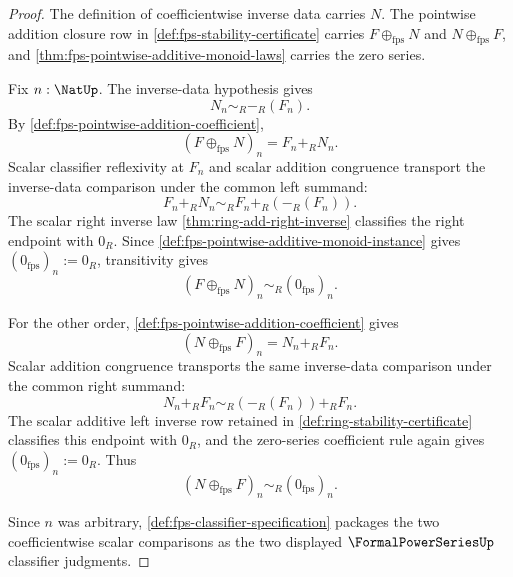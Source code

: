 \begin{proof}
The definition of coefficientwise inverse data carries $N$. The pointwise addition closure row in \autoref{def:fps-stability-certificate} carries $F\oplus_{\mathrm{fps}}N$ and $N\oplus_{\mathrm{fps}}F$, and \autoref{thm:fps-pointwise-additive-monoid-laws} carries the zero series.

Fix $n:\NatUp$. The inverse-data hypothesis gives
$$
N_n\sim_R -_R(F_n).
$$
By \autoref{def:fps-pointwise-addition-coefficient},
$$
(F\oplus_{\mathrm{fps}}N)_n=F_n+_R N_n.
$$
Scalar classifier reflexivity at $F_n$ and scalar addition congruence transport the inverse-data comparison under the common left summand:
$$
F_n+_R N_n\sim_R F_n+_R(-_R(F_n)).
$$
The scalar right inverse law \autoref{thm:ring-add-right-inverse} classifies the right endpoint with $0_R$. Since \autoref{def:fps-pointwise-additive-monoid-instance} gives $(0_{\mathrm{fps}})_n:=0_R$, transitivity gives
$$
(F\oplus_{\mathrm{fps}}N)_n\sim_R(0_{\mathrm{fps}})_n.
$$

For the other order, \autoref{def:fps-pointwise-addition-coefficient} gives
$$
(N\oplus_{\mathrm{fps}}F)_n=N_n+_R F_n.
$$
Scalar addition congruence transports the same inverse-data comparison under the common right summand:
$$
N_n+_R F_n\sim_R(-_R(F_n))+_R F_n.
$$
The scalar additive left inverse row retained in \autoref{def:ring-stability-certificate} classifies this endpoint with $0_R$, and the zero-series coefficient rule again gives $(0_{\mathrm{fps}})_n:=0_R$. Thus
$$
(N\oplus_{\mathrm{fps}}F)_n\sim_R(0_{\mathrm{fps}})_n.
$$

Since $n$ was arbitrary, \autoref{def:fps-classifier-specification} packages the two coefficientwise scalar comparisons as the two displayed $\FormalPowerSeriesUp$ classifier judgments.
\end{proof}

